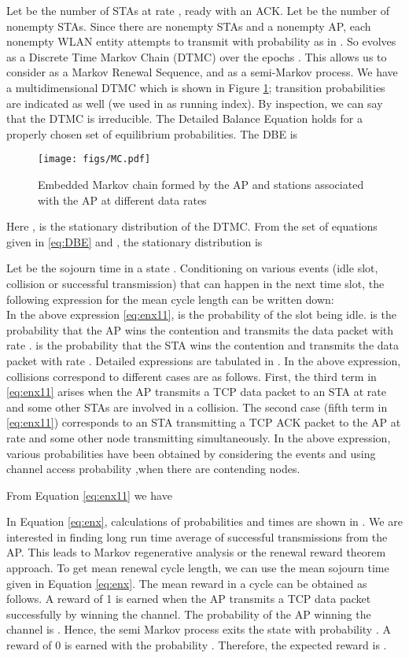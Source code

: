 \documentclass[conference]{IEEEtran}
\begin{document}
Let  be the number of STAs at rate , ready with an ACK. 
Let  be the number of nonempty STAs. Since there
are  nonempty STAs and a nonempty AP, each nonempty WLAN entity attempts to
transmit with probability  as in \cite{astn_model:kumar}. So 
 evolves as a Discrete Time Markov Chain
(DTMC) over the epochs . This allows us to consider
 as a Markov Renewal Sequence, and
 as a semi-Markov process.
We have a multidimensional DTMC which is shown in Figure \ref{fig:MarkovChain};
transition probabilities are indicated as well (we used in  as running index). By inspection, we can say that 
the DTMC is irreducible. The Detailed Balance Equation holds for a properly
chosen set of equilibrium probabilities. The DBE is
\begin{figure}\centering
\texttt{[image: figs/MC.pdf]}
\caption{Embedded Markov chain formed by the AP and  stations associated with the AP at  different data rates }
\label{fig:MarkovChain}
\end{figure}

Here ,  is the stationary distribution of the DTMC. From the set 
of equations given in \eqref{eq:DBE} and 
, the stationary distribution is
	
Let  be the sojourn time in a state . 
Conditioning on various events (idle slot, collision or successful 
transmission) that can happen in the next time slot, the
following expression for the mean cycle length can be written down: \\

In the above expression \eqref{eq:enx11},  is the probability of
the slot being idle.  is the probability that the AP wins the
contention and transmits the data packet with rate . 
is the probability that the STA wins the contention and transmits the data
packet with rate . Detailed expressions are tabulated in 
\cite{astn_model:pradeep_kuri}.
In the above expression, collisions correspond to different cases are as
follows. First, the third term in \eqref{eq:enx11} arises when the AP transmits
a TCP data packet to an STA at rate  and some other STAs are involved in
a collision. The second case (fifth term in \eqref{eq:enx11}) corresponds to an
STA transmitting a TCP ACK packet to the AP at rate  and some other node
transmitting simultaneously. In the above expression, various probabilities
have been obtained by considering the events and using channel access
probability ,when there are  contending nodes.

From Equation \eqref{eq:enx11} we have 

In Equation \ref{eq:enx}, calculations of probabilities and times are shown in \cite{astn_model:pradeep_kuri}.
We are interested in finding long run time average of successful transmissions
from the AP. This leads to Markov regenerative analysis or the renewal reward
theorem approach. To get mean renewal cycle length, we can use the mean sojourn
time given in Equation \eqref{eq:enx}. The mean reward in a cycle can be obtained
as follows. 
A reward of 1 is earned when the AP transmits a TCP data packet successfully by 
winning the channel. The probability of the AP winning the channel is  
. Hence, the semi Markov 
process exits the state  with probability . A reward of 0 is earned with the probability . Therefore, the expected reward is  .
\end{document}
